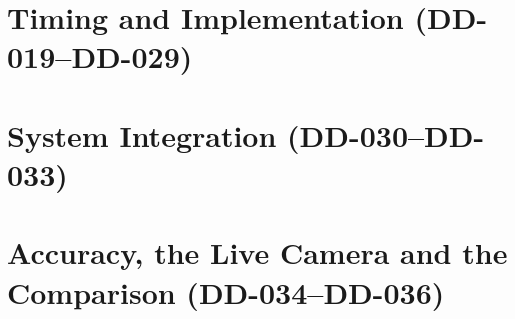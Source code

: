 \section{Timing and Implementation (DD-019--DD-029)}
\label{sec:decisions-timing}

\section{System Integration (DD-030--DD-033)}
\label{sec:decisions-integration}

\section{Accuracy, the Live Camera and the Comparison (DD-034--DD-036)}
\label{sec:decisions-evaluation}

